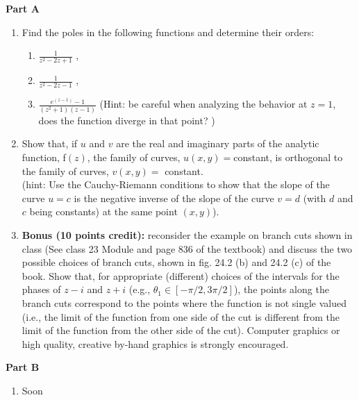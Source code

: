 \documentclass[fleqn]{article}
\begin{document}
  \textbf{Part A}
  \begin{enumerate}

    \item Find the poles in the following functions and determine their orders:
      \begin{enumerate}
        \item  $\frac{1}{z^2 - 2z + 1}$ , 
        \item  $\frac{1}{z^2 - 2z - 1}$ , 
        \item   $\frac{e^{(z-1)} - 1}{(z^2 + 1) (z - 1)}$  (Hint: be careful when analyzing the behavior at $z=1$, does the function diverge in that point? )
      \end{enumerate}

    \item Show that, if $u$ and $v$ are the real and imaginary parts of the analytic function, f$ (z)$,
    the family of curves, $u(x, y) = $constant, is orthogonal to the family of curves, $v(x, y) =$ constant.\\
    (hint: Use the Cauchy-Riemann conditions to show that the slope of the curve $u = c$ is the negative inverse of the slope of the curve $v = d$ (with $d$ and $c$ being constants) at the same point $(x, y)$). 


    \item {\bf Bonus (10 points credit): } reconsider the example on branch cuts shown in class (See class 23 Module and page 836 of the textbook) 
    and discuss the two possible choices of branch cuts, shown in fig. 24.2 (b) and 24.2 (c) of the book. Show that, 
    for appropriate (different) choices of the intervals for the phases of $z-i$ and $z+i$ (e.g., $\theta_1 \in [ -\pi/2 , 3 \pi/2]$), 
    the points along the branch cuts correspond to the points where the function is not single valued (i.e., the limit of the 
    function from one side of the cut is different from the limit of the function from the other side of the cut).  
    Computer graphics or high quality, creative by-hand graphics is strongly encouraged. 

  \end{enumerate}

  \pagebreak

  \textbf{Part B}
  \begin{enumerate}
    \item Soon
  \end{enumerate}
\end{document}
